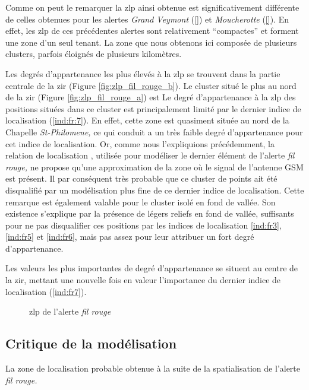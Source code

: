 Comme on peut le remarquer la \ac{zlp} ainsi obtenue est
significativement différente de celles obtenues pour les alertes
\emph{Grand Veymont} (\autoref{}) et \emph{Moucherotte}
(\autoref{}). En effet, les \ac{zlp} de ces précédentes alertes sont
relativement \enquote{compactes} et forment une zone d'un seul
tenant. La zone que nous obtenons ici composée de plusieurs clusters,
parfois éloignés de plusieurs kilomètres.

Les degrés d'appartenance les plus élevés à la \ac{zlp} se trouvent
dans la partie centrale de la \ac{zir} (Figure
\ref{fig:zlp_fil_rouge_b}).
%
Le cluster situé le plus au nord de la \ac{zir} (Figure
\ref{fig:zlp_fil_rouge_a}) est
%
Le degré d'appartenance à la \ac{zlp} des positions situées dans ce
cluster est principalement limité par le dernier indice de
localisation (\ref{ind:fr:7}). En effet, cette zone est quasiment
située au nord de la Chapelle \emph{St-Philomene,} ce qui conduit a un
très faible degré d’appartenance pour cet indice de localisation. Or,
comme nous l'expliquions précédemment, la relation de localisation
, utilisée pour modéliser le dernier élément de
l'alerte \emph{fil rouge,} ne propose qu'une approximation de la zone
où le signal de l'antenne GSM est présent. Il par conséquent très
probable que ce cluster de points ait été disqualifié par un
modélisation plus fine de ce dernier indice de localisation. Cette
remarque est également valable pour le cluster isolé en fond de
vallée. Son existence s'explique par la présence de légers reliefs en
fond de vallée, suffisants pour ne pas disqualifier ces positions par
les indices de localisation \ref{ind:fr3}, \ref{ind:fr5} et
\ref{ind:fr6}, mais pas assez pour leur attribuer un fort degré
d'appartenance.

Les valeurs les plus importantes de degré d'appartenance se situent au
centre de la \ac{zir}, mettant une nouvelle fois en valeur
l'importance du dernier indice de localisation (\ref{ind:fr7}).

\begin{figure}
  \centering
  
  \caption{\ac{zlp} de l'alerte \emph{fil rouge}}
  \label{fig:zlp_fil_rouge}
\end{figure}

\subsection{Critique de la modélisation}
\label{subsec:9-4-3}

La zone de localisation probable obtenue à la suite de la
spatialisation de l'alerte \emph{fil rouge.}


